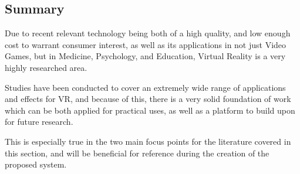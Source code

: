 

	\subsection{Summary}
	\label{lr:vr:conclusion}
		Due to recent relevant technology being both of a high quality, and low enough cost to warrant consumer interest, as well as its applications in not just Video Games, but in Medicine, Psychology, and Education, Virtual Reality is a very highly researched area.

		Studies have been conducted to cover an extremely wide range of applications and effects for VR, and because of this, there is a very solid foundation of work which can be both applied for practical uses, as well as a platform to build upon for future research.

		This is especially true in the two main focus points for the literature covered in this section, and will be beneficial for reference during the creation of the proposed system.
